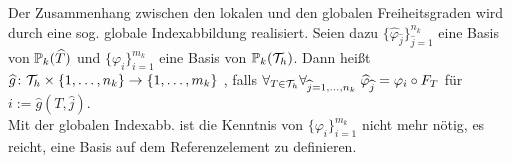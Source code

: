 \begin{Bem}
    Der Zusammenhang zwischen den lokalen und den globalen Freiheitsgraden wird durch eine
    sog. globale Indexabbildung realisiert.
    Seien dazu
    $\{\widehat{\varphi}_{\widehat{j}}\}_{\widehat{j}=1}^{n_k}$
    eine Basis von $\mathbb{P}_k(\widehat{T})$ und
    $\{\varphi_i\}_{i=1}^{m_k}$ eine Basis von $\mathbb{P}_k(\mathcal{T}_h)$.
    Dann heißt
    $\widehat{g}\colon \mathcal{T}_h \times \{1, \dotsc, n_k\} \to \{1, \dotsc, m_k\}$
    ,
    falls $\forall_{T \in \mathcal{T}_h} \forall_{\widehat{j}=1,\dotsc,n_k}\;
    \widehat{\varphi}_{\widehat{j}} = \varphi_i \circ F_T$ für
    $i := \widehat{g}(T, \widehat{j})$.\\
    Mit der globalen Indexabb. ist die Kenntnis von $\{\varphi_i\}_{i=1}^{m_k}$
    nicht mehr nötig, es reicht, eine Basis auf dem Referenzelement zu definieren.
\end{Bem}

\linie

